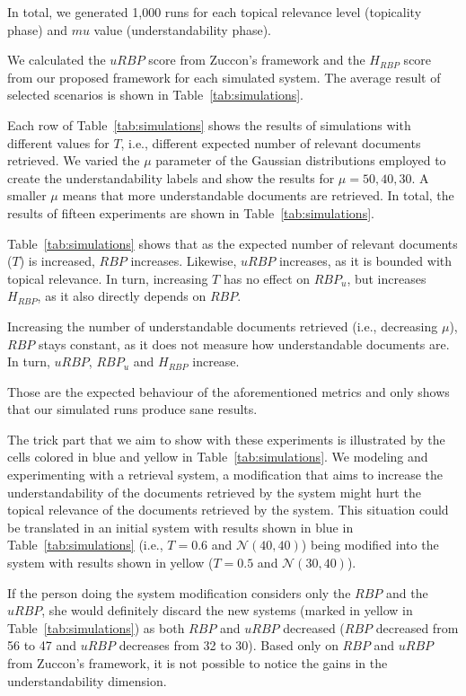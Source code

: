In total, we generated 1,000 runs for each topical relevance level (topicality phase) and $mu$ value (understandability phase). 

We calculated the $uRBP$ score from Zuccon's framework and the $H_{RBP}$ score from our proposed framework for each simulated system.
The average result of selected scenarios is shown in Table~\ref{tab:simulations}.

Each row of Table~\ref{tab:simulations} shows the results of simulations with different values for $T$, i.e., different expected number of relevant documents retrieved.
We varied the $\mu$ parameter of the Gaussian distributions employed to create the understandability labels and show the results for $\mu = 50, 40, 30$.
A smaller $\mu$ means that more understandable documents are retrieved.
In total, the results of fifteen experiments are shown in Table~\ref{tab:simulations}.

Table~\ref{tab:simulations} shows that as the expected number of relevant documents ($T$) is increased, $RBP$ increases.
Likewise, $uRBP$ increases, as it is bounded with topical relevance.
In turn, increasing $T$ has no effect on $RBP_u$, but increases $H_{RBP}$, as it also directly depends on $RBP$.

Increasing the number of understandable documents retrieved (i.e., decreasing $\mu$), $RBP$ stays constant, as it does not measure how understandable documents are.
In turn, $uRBP$, $RBP_u$ and $H_{RBP}$ increase.

Those are the expected behaviour of the aforementioned metrics and only shows that our simulated runs produce sane results.

The trick part that we aim to show with these experiments is illustrated by the cells colored in blue and yellow in Table~\ref{tab:simulations}.
We modeling and experimenting with a retrieval system, a modification that aims to increase the understandability of the documents retrieved by the system might hurt the topical relevance of the documents retrieved by the system.
This situation could be translated in an initial system with results shown in blue in Table~\ref{tab:simulations} (i.e., $T=0.6$ and $\mathcal{N}(40,40)$) 
being modified into the system with results shown in yellow ($T=0.5$ and $\mathcal{N}(30,40)$).

If the person doing the system modification considers only the $RBP$ and the $uRBP$, she would definitely discard the new systems (marked in yellow in Table~\ref{tab:simulations}) as both $RBP$ and $uRBP$ decreased ($RBP$ decreased from 56 to 47 and $uRBP$ decreases from 32 to 30). Based only on $RBP$ and $uRBP$ from Zuccon's framework, it is not possible to notice the gains in the understandability dimension.

